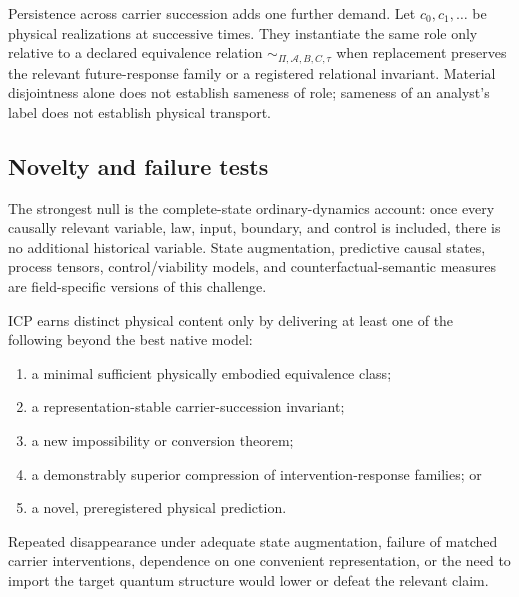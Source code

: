 Persistence across carrier succession adds one further demand. Let
$c_0,c_1,\ldots$ be physical realizations at successive times. They instantiate
the same role only relative to a declared equivalence relation $\sim_{\Pi,
\mathcal A,B,C,\tau}$ when replacement preserves the relevant future-response
family or a registered relational invariant. Material disjointness alone does
not establish sameness of role; sameness of an analyst's label does not
establish physical transport.

\subsection{Novelty and failure tests}

The strongest null is the complete-state ordinary-dynamics account: once every
causally relevant variable, law, input, boundary, and control is included,
there is no additional historical variable. State augmentation, predictive
causal states, process tensors, control/viability models, and
counterfactual-semantic measures are field-specific versions of this challenge.

ICP earns distinct physical content only by delivering at least one of the
following beyond the best native model:
\begin{enumerate}
  \item a minimal sufficient physically embodied equivalence class;
  \item a representation-stable carrier-succession invariant;
  \item a new impossibility or conversion theorem;
  \item a demonstrably superior compression of intervention-response families;
  or
  \item a novel, preregistered physical prediction.
\end{enumerate}
Repeated disappearance under adequate state augmentation, failure of matched
carrier interventions, dependence on one convenient representation, or the
need to import the target quantum structure would lower or defeat the relevant
claim.

